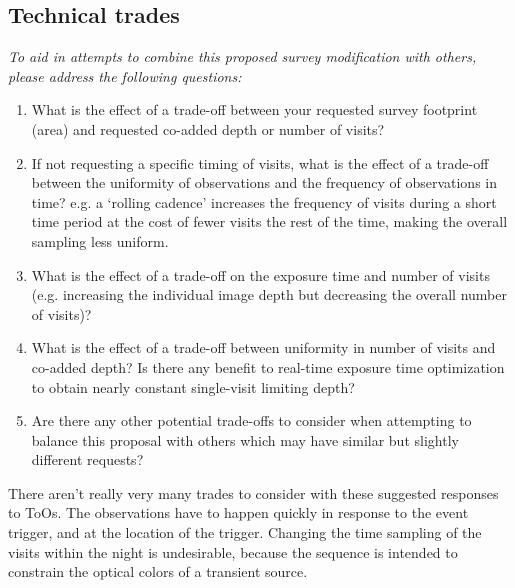 \documentclass[12pt, letterpaper]{article}
\begin{document}
\subsection{Technical trades}
\begin{footnotesize}
{\it To aid in attempts to combine this proposed survey modification with others, please address the following questions:
\begin{enumerate}
    \item What is the effect of a trade-off between your requested survey footprint (area) and requested co-added depth or number of visits?
    \item If not requesting a specific timing of visits, what is the effect of a trade-off between the uniformity of observations and the frequency of observations in time? e.g. a `rolling cadence' increases the frequency of visits during a short time period at the cost of fewer visits the rest of the time, making the overall sampling less uniform.
    \item What is the effect of a trade-off on the exposure time and number of visits (e.g. increasing the individual image depth but decreasing the overall number of visits)?
    \item What is the effect of a trade-off between uniformity in number of visits and co-added depth? Is there any benefit to real-time exposure time optimization to obtain nearly constant single-visit limiting depth?
    \item Are there any other potential trade-offs to consider when attempting to balance this proposal with others which may have similar but slightly different requests?
\end{enumerate}}
\end{footnotesize}

There aren't really very many trades to consider with these suggested responses to ToOs. The observations have to happen quickly in response to the event trigger, and
at the location of the trigger. Changing the time sampling of the visits within the night is undesirable, because the sequence is intended to constrain the optical
colors of a transient source.
\end{document}
